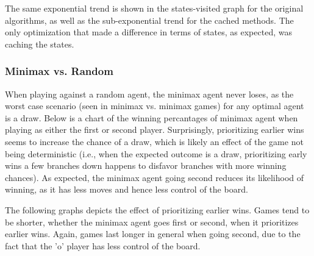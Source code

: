 \documentclass[12pt]{article}
\begin{document}
The same exponential trend is shown in the states-visited graph for the original algorithms, as well as the sub-exponential trend for the cached methods. The only optimization that made a difference in terms of states, as expected, was caching the states.

\subsubsection*{Minimax vs. Random}

When playing against a random agent, the minimax agent never loses, as the worst case scenario (seen in minimax vs. minimax games) for any optimal agent is a draw. Below is a chart of the winning percantages of minimax agent when playing as either the first or second player. Surprisingly, prioritizing earlier wins seems to increase the chance of a draw, which is likely an effect of the game not being deterministic (i.e., when the expected outcome is a draw, prioritizing early wins a few branches down happens to disfavor branches with more winning chances). As expected, the minimax agent going second reduces its likelihood of winning, as it has less moves and hence less control of the board.
\begin{center}
\end{center}

The following graphs depicts the effect of prioritizing earlier wins. Games tend to be shorter, whether the minimax agent goes first or second, when it prioritizes earlier wins. Again, games last longer in general when going second, due to the fact that the 'o' player has less control of the board.
\end{document}
